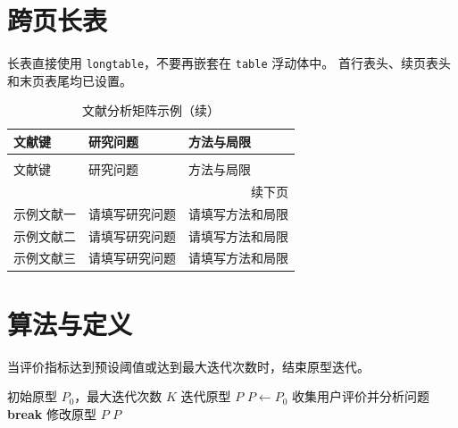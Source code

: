 \section{跨页长表}
长表直接使用 \texttt{longtable}，不要再嵌套在 \texttt{table} 浮动体中。
首行表头、续页表头和末页表尾均已设置。
\begin{longtable}{p{28mm}p{45mm}p{55mm}}
  \caption{文献分析矩阵示例}\label{tab:literature-matrix}\\
  \toprule 文献键 & 研究问题 & 方法与局限\\\midrule
  \endfirsthead
  \caption[]{文献分析矩阵示例（续）}\\
  \toprule 文献键 & 研究问题 & 方法与局限\\\midrule
  \endhead
  \midrule\multicolumn{3}{r}{续下页}\\
  \endfoot
  \bottomrule
  \endlastfoot
  示例文献一 & 请填写研究问题 & 请填写方法和局限\\
  示例文献二 & 请填写研究问题 & 请填写方法和局限\\
  示例文献三 & 请填写研究问题 & 请填写方法和局限\\
\end{longtable}

\section{算法与定义}
\begin{definition}[迭代停止条件]
当评价指标达到预设阈值或达到最大迭代次数时，结束原型迭代。
\end{definition}
\begin{algorithm}[htbp]
  \caption{原型迭代流程示例}\label{alg:iteration}
  \begin{algorithmic}[1]
    \Require 初始原型 $P_0$，最大迭代次数 $K$
    \Ensure 迭代原型 $P$
    \State $P \gets P_0$
      \State 收集用户评价并分析问题
        \State \textbf{break}
      \EndIf
      \State 修改原型 $P$
    \EndFor
    \State \Return $P$
  \end{algorithmic}
\end{algorithm}
